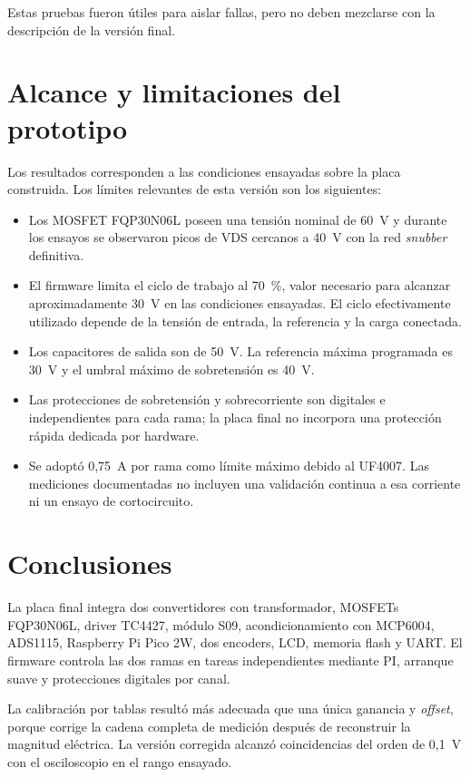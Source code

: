 \documentclass[conference]{IEEEtran}
\begin{document}
Estas pruebas fueron útiles para aislar fallas, pero no deben mezclarse con la descripción de la versión final.

\section{Alcance y limitaciones del prototipo}

Los resultados corresponden a las condiciones ensayadas sobre la placa construida. Los límites relevantes de esta versión son los siguientes:

\begin{itemize}
\item Los MOSFET FQP30N06L poseen una tensión nominal de 60~V y durante los ensayos se observaron picos de VDS cercanos a 40~V con la red \textit{snubber} definitiva.
\item El firmware limita el ciclo de trabajo al 70~\%, valor necesario para alcanzar aproximadamente 30~V en las condiciones ensayadas. El ciclo efectivamente utilizado depende de la tensión de entrada, la referencia y la carga conectada.
\item Los capacitores de salida son de 50~V. La referencia máxima programada es 30~V y el umbral máximo de sobretensión es 40~V.
\item Las protecciones de sobretensión y sobrecorriente son digitales e independientes para cada rama; la placa final no incorpora una protección rápida dedicada por hardware.
\item Se adoptó 0,75~A por rama como límite máximo debido al UF4007. Las mediciones documentadas no incluyen una validación continua a esa corriente ni un ensayo de cortocircuito.
\end{itemize}

\section{Conclusiones}

La placa final integra dos convertidores con transformador, MOSFETs FQP30N06L, driver TC4427, módulo S09, acondicionamiento con MCP6004, ADS1115, Raspberry Pi Pico 2W, dos encoders, LCD, memoria flash y UART. El firmware controla las dos ramas en tareas independientes mediante PI, arranque suave y protecciones digitales por canal.

La calibración por tablas resultó más adecuada que una única ganancia y \textit{offset}, porque corrige la cadena completa de medición después de reconstruir la magnitud eléctrica. La versión corregida alcanzó coincidencias del orden de 0,1~V con el osciloscopio en el rango ensayado.
\end{document}
